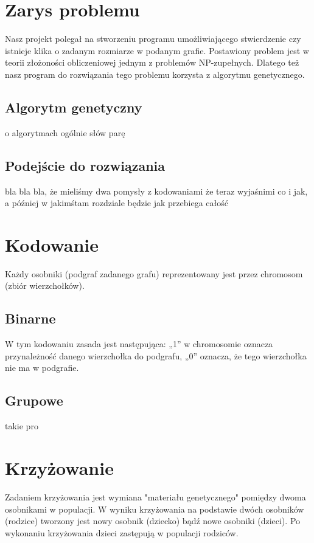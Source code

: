 \documentclass[11pt]{aghdpl}
\author{Wojciech Kasperek, Krzysztof Spytkowski, Izabela Śmietana}
\date{2014}
\begin{document}
\titlepages

\tableofcontents
\clearpage

\chapter{Zarys problemu}
\label{cha:wprowadzenie}
Nasz projekt polegał na stworzeniu programu umożliwiającego stwierdzenie czy istnieje klika o zadanym rozmiarze w podanym grafie. Postawiony problem jest w teorii złożoności obliczeniowej jednym z problemów NP-zupełnych. Dlatego też nasz program do rozwiązania tego problemu korzysta z algorytmu genetycznego. 
\section{Algorytm genetyczny}
\label{sec:algGenetyczne}
o algorytmach ogólnie słów parę
\section{Podejście do rozwiązania}
\label{sec:podejscie}
bla bla bla, że mieliśmy dwa pomysły z kodowaniami
że teraz wyjaśnimi co i jak, a później w jakimśtam rozdziale będzie jak przebiega całość

\chapter{Kodowanie}
\label{cha:encoding}
Każdy osobniki (podgraf zadanego grafu) reprezentowany jest przez chromosom (zbiór wierzchołków). 
\section{Binarne}
\label{sec:binary}
W tym kodowaniu zasada jest następująca: „1” w chromosomie oznacza przynależność danego wierzchołka do podgrafu, „0” oznacza, że tego wierzchołka nie ma w podgrafie.
\section{Grupowe}
\label{sec:group}
takie pro

\chapter{Krzyżowanie}
\label{cha:crossing}
Zadaniem krzyżowania jest wymiana "materiału genetycznego" pomiędzy dwoma osobnikami w populacji. W wyniku krzyżowania na podstawie dwóch osobników (rodzice) tworzony jest nowy osobnik (dziecko) bądź nowe osobniki (dzieci). Po wykonaniu krzyżowania dzieci zastępują w populacji rodziców. 
 
\end{document}

